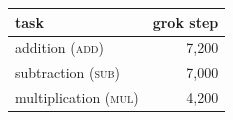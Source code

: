 \begin{tabular}{lr}
\toprule
task & grok step \\
\midrule
addition (\textsc{add}) & 7,200 \\
subtraction (\textsc{sub}) & 7,000 \\
multiplication (\textsc{mul}) & 4,200 \\
\bottomrule
\end{tabular}
